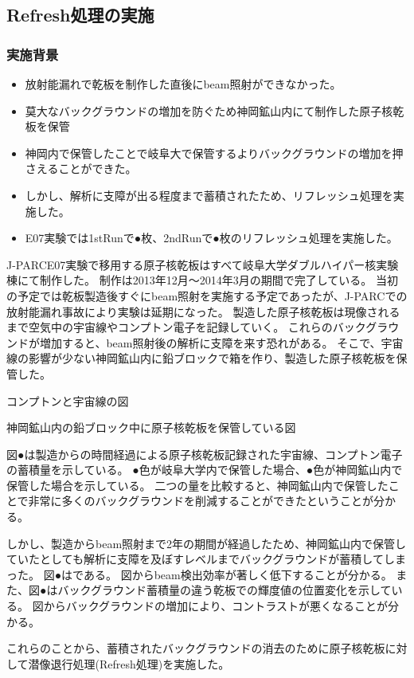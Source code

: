 \documentclass[12pt,a4paper]{jarticle}
\begin{document}
\subsection{Refresh処理の実施}
\subsubsection{実施背景}
\begin{itemize}
 \item 放射能漏れで乾板を制作した直後にbeam照射ができなかった。
 \item 莫大なバックグラウンドの増加を防ぐため神岡鉱山内にて制作した原子核乾板を保管
 \item 神岡内で保管したことで岐阜大で保管するよりバックグラウンドの増加を押さえることができた。
 \item しかし、解析に支障が出る程度まで蓄積されたため、リフレッシュ処理を実施した。
 \item E07実験では1stRunで●枚、2ndRunで●枚のリフレッシュ処理を実施した。
\end{itemize}
J-PARCE07実験で移用する原子核乾板はすべて岐阜大学ダブルハイパー核実験棟にて制作した。
制作は2013年12月～2014年3月の期間で完了している。
当初の予定では乾板製造後すぐにbeam照射を実施する予定であったが、J-PARCでの放射能漏れ事故により実験は延期になった。
製造した原子核乾板は現像されるまで空気中の宇宙線やコンプトン電子を記録していく。
これらのバックグラウンドが増加すると、beam照射後の解析に支障を来す恐れがある。
そこで、宇宙線の影響が少ない神岡鉱山内に鉛ブロックで箱を作り、製造した原子核乾板を保管した。
\par
コンプトンと宇宙線の図
\par
神岡鉱山内の鉛ブロック中に原子核乾板を保管している図
\par
図●は製造からの時間経過による原子核乾板記録された宇宙線、コンプトン電子の蓄積量を示している。
●色が岐阜大学内で保管した場合、●色が神岡鉱山内で保管した場合を示している。
二つの量を比較すると、神岡鉱山内で保管したことで非常に多くのバックグラウンドを削減することができたということが分かる。
\par
しかし、製造からbeam照射まで2年の期間が経過したため、神岡鉱山内で保管していたとしても解析に支障を及ぼすレベルまでバックグラウンドが蓄積してしまった。
図●はである。
図からbeam検出効率が著しく低下することが分かる。
また、図●はバックグラウンド蓄積量の違う乾板での輝度値の位置変化を示している。
図からバックグラウンドの増加により、コントラストが悪くなることが分かる。
\par
これらのことから、蓄積されたバックグラウンドの消去のために原子核乾板に対して潜像退行処理(Refresh処理)を実施した。
\end{document}
